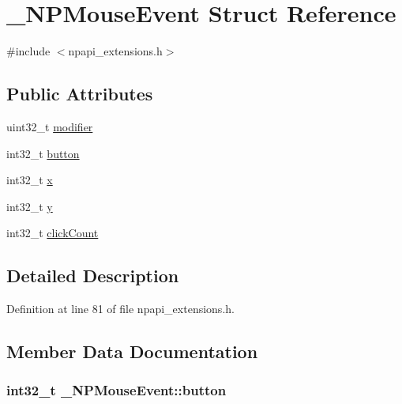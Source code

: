 \hypertarget{struct___n_p_mouse_event}{
\section{\_\-NPMouseEvent Struct Reference}
\label{struct___n_p_mouse_event}
}


{\ttfamily \#include $<$npapi\_\-extensions.h$>$}

\subsection*{Public Attributes}
\begin{DoxyCompactItemize}
\item 
uint32\_\-t \hyperlink{struct___n_p_mouse_event_acd6d4f0ca5929f06c5d14bab34afaf42}{modifier}
\item 
int32\_\-t \hyperlink{struct___n_p_mouse_event_a90ec6535781ec12980e249c2ff15abe4}{button}
\item 
int32\_\-t \hyperlink{struct___n_p_mouse_event_a8d3fd458faf6af0179fd231ed40dd8b9}{x}
\item 
int32\_\-t \hyperlink{struct___n_p_mouse_event_a2b4778764228e697f81345dccb6ec783}{y}
\item 
int32\_\-t \hyperlink{struct___n_p_mouse_event_acafa461f9ccac3cf9ca2aee1859359de}{clickCount}
\end{DoxyCompactItemize}


\subsection{Detailed Description}


Definition at line 81 of file npapi\_\-extensions.h.



\subsection{Member Data Documentation}
\hypertarget{struct___n_p_mouse_event_a90ec6535781ec12980e249c2ff15abe4}{
\subsubsection[{button}]{\setlength{\rightskip}{0pt plus 5cm}int32\_\-t {\bf \_\-NPMouseEvent::button}}}
\label{struct___n_p_mouse_event_a90ec6535781ec12980e249c2ff15abe4}


